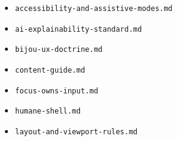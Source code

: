 \begin{itemize}
\tightlist
\item
  \texttt{a\allowbreak{}c\allowbreak{}c\allowbreak{}e\allowbreak{}s\allowbreak{}s\allowbreak{}i\allowbreak{}b\allowbreak{}i\allowbreak{}l\allowbreak{}i\allowbreak{}t\allowbreak{}y\allowbreak{}-\allowbreak{}a\allowbreak{}n\allowbreak{}d\allowbreak{}-\allowbreak{}a\allowbreak{}s\allowbreak{}s\allowbreak{}i\allowbreak{}s\allowbreak{}t\allowbreak{}i\allowbreak{}v\allowbreak{}e\allowbreak{}-\allowbreak{}m\allowbreak{}o\allowbreak{}d\allowbreak{}e\allowbreak{}s\allowbreak{}.\allowbreak{}m\allowbreak{}d}
\item
  \texttt{a\allowbreak{}i\allowbreak{}-\allowbreak{}e\allowbreak{}x\allowbreak{}p\allowbreak{}l\allowbreak{}a\allowbreak{}i\allowbreak{}n\allowbreak{}a\allowbreak{}b\allowbreak{}i\allowbreak{}l\allowbreak{}i\allowbreak{}t\allowbreak{}y\allowbreak{}-\allowbreak{}s\allowbreak{}t\allowbreak{}a\allowbreak{}n\allowbreak{}d\allowbreak{}a\allowbreak{}r\allowbreak{}d\allowbreak{}.\allowbreak{}m\allowbreak{}d}
\item
  \texttt{b\allowbreak{}i\allowbreak{}j\allowbreak{}o\allowbreak{}u\allowbreak{}-\allowbreak{}u\allowbreak{}x\allowbreak{}-\allowbreak{}d\allowbreak{}o\allowbreak{}c\allowbreak{}t\allowbreak{}r\allowbreak{}i\allowbreak{}n\allowbreak{}e\allowbreak{}.\allowbreak{}m\allowbreak{}d}
\item
  \texttt{c\allowbreak{}o\allowbreak{}n\allowbreak{}t\allowbreak{}e\allowbreak{}n\allowbreak{}t\allowbreak{}-\allowbreak{}g\allowbreak{}u\allowbreak{}i\allowbreak{}d\allowbreak{}e\allowbreak{}.\allowbreak{}m\allowbreak{}d}
\item
  \texttt{f\allowbreak{}o\allowbreak{}c\allowbreak{}u\allowbreak{}s\allowbreak{}-\allowbreak{}o\allowbreak{}w\allowbreak{}n\allowbreak{}s\allowbreak{}-\allowbreak{}i\allowbreak{}n\allowbreak{}p\allowbreak{}u\allowbreak{}t\allowbreak{}.\allowbreak{}m\allowbreak{}d}
\item
  \texttt{h\allowbreak{}u\allowbreak{}m\allowbreak{}a\allowbreak{}n\allowbreak{}e\allowbreak{}-\allowbreak{}s\allowbreak{}h\allowbreak{}e\allowbreak{}l\allowbreak{}l\allowbreak{}.\allowbreak{}m\allowbreak{}d}
\item
  \texttt{l\allowbreak{}a\allowbreak{}y\allowbreak{}o\allowbreak{}u\allowbreak{}t\allowbreak{}-\allowbreak{}a\allowbreak{}n\allowbreak{}d\allowbreak{}-\allowbreak{}v\allowbreak{}i\allowbreak{}e\allowbreak{}w\allowbreak{}p\allowbreak{}o\allowbreak{}r\allowbreak{}t\allowbreak{}-\allowbreak{}r\allowbreak{}u\allowbreak{}l\allowbreak{}e\allowbreak{}s\allowbreak{}.\allowbreak{}m\allowbreak{}d}

\end{itemize}
